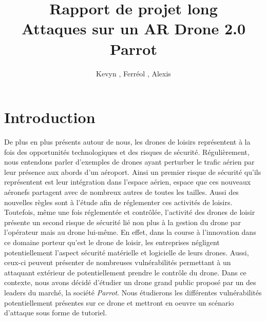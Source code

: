 \documentclass[a4paper,12pt]{report}
\title{Rapport de projet long \\ Attaques sur un AR Drone 2.0 Parrot}
\author{Kevyn \bsc{Ledieu}, Ferréol \bsc{Pennel}, Alexis \bsc{Pernot}}
\begin{document}
\maketitle
\tableofcontents
\newpage

\section{Introduction}
De plus en plus présents autour de nous, les drones de loisirs représentent à la fois des opportunités technologiques et des risques de sécurité. Régulièrement, nous entendons parler d'exemples de drones ayant perturber le trafic aérien par leur présence aux abords d'un aéroport. Ainsi un premier risque de sécurité qu'ils représentent est leur intégration dans l'espace aérien, espace que ces nouveaux aéronefs partagent avec de nombreux autres de toutes les tailles. Aussi des nouvelles règles sont à l'étude afin de réglementer ces activités de loisirs. Toutefois, même une fois réglementée et contrôlée, l'activité des drones de loisir présente un second risque de sécurité lié non plus à la gestion du drone par l'opérateur mais au drone lui-même. En effet, dans la course à l'innovation dans ce domaine porteur qu'est le drone de loisir, les entreprises négligent potentiellement l'aspect sécurité matérielle et logicielle de leurs drones. Aussi, ceux-ci peuvent présenter de nombreuses vulnérabilités permettant à un attaquant extérieur de potentiellement prendre le contrôle du drone. Dans ce contexte, nous avons décidé d'étudier un drone grand public proposé par un des leaders du marché, la société \textit{Parrot}. Nous étudierons les différentes vulnérabilités potentiellement présentes sur ce drone et mettront en oeuvre un scénario d'attaque sous forme de tutoriel.













\nocite{*}


\end{document}
